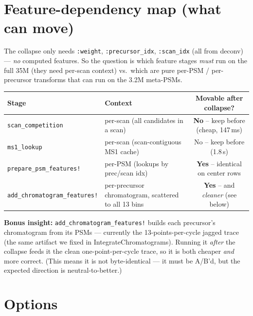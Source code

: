 \documentclass[11pt]{article}
\newcommand{\code}[1]{\texttt{\small #1}}
\begin{document}
\section{Feature-dependency map (what can move)}

The collapse only needs \code{:weight}, \code{:precursor\_idx}, \code{:scan\_idx}
(all from deconv) --- \emph{no} computed features. So the question is which feature
stages \emph{must} run on the full 35M (they need per-scan context) vs.\ which are
pure per-PSM / per-precursor transforms that can run on the 3.2M meta-PSMs.

\begin{center}
\begin{tabular}{p{} p{} c}
\toprule
Stage & Context & Movable after collapse? \\
\midrule
\code{scan\_competition} & per-scan (all candidates in a scan) & \textbf{No} -- keep before (cheap, 147\,ms) \\
\code{ms1\_lookup} & per-scan (scan-contiguous MS1 cache) & No -- keep before (1.8\,s) \\
\code{prepare\_psm\_features!} & per-PSM (lookups by prec/scan idx) & \textbf{Yes} -- identical on center rows \\
\code{add\_chromatogram\_features!} & per-precursor chromatogram, scattered to all 13 bins & \textbf{Yes} -- and \emph{cleaner} (see below) \\
\bottomrule
\end{tabular}
\end{center}

\textbf{Bonus insight:} \code{add\_chromatogram\_features!} builds each precursor's
chromatogram from its PSMs --- currently the 13-points-per-cycle jagged trace (the
same artifact we fixed in IntegrateChromatograms). Running it \emph{after} the
collapse feeds it the clean one-point-per-cycle trace, so it is both cheaper
\emph{and} more correct. (This means it is not byte-identical --- it must be A/B'd,
but the expected direction is neutral-to-better.)

\section{Options}
\end{document}
